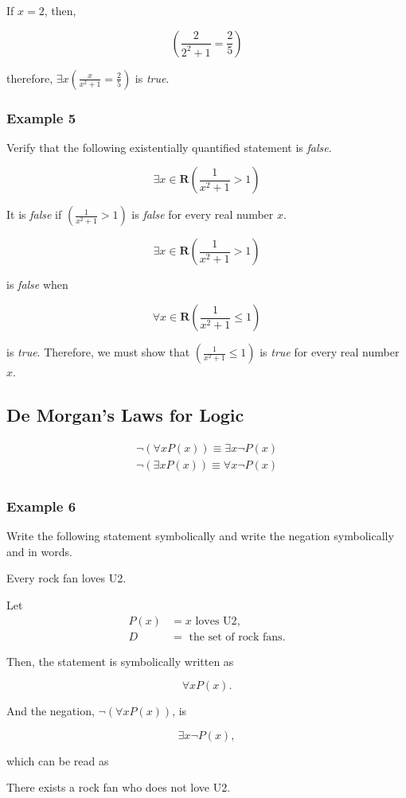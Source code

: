 If $x = 2$, then,

\[
    \left( \frac{2}{2^2 + 1} = \frac{2}{5} \right)
\]

therefore, $\exists x \left( \frac{x}{x^2 + 1} = \frac{2}{5} \right)$ is \textit{true}.

\subsubsection*{Example 5}

Verify that the following existentially quantified statement is \textit{false}.

\[
    \exists x \in \textbf{R} \left( \frac{1}{x^2 + 1} > 1 \right)
\]

It is \textit{false} if $\left( \frac{1}{x^2 + 1} > 1 \right)$ is \textit{false} for every real number $x$.

\[
    \exists x \in \textbf{R} \left( \frac{1}{x^2 + 1} > 1 \right)
\]

is \textit{false} when

\[
    \forall x \in \textbf{R} \left( \frac{1}{x^2 + 1} \leq 1 \right)
\]

is \textit{true}.  Therefore, we must show that $\left( \frac{1}{x^2 + 1} \leq 1 \right)$ is \textit{true} for every real number $x$.

\subsection*{De Morgan's Laws for Logic}

\begin{align*}
    \lnot(\forall x P(x)) \equiv \exists x \lnot P(x)\\
    \lnot(\exists x P(x)) \equiv \forall x \lnot P(x)\\
\end{align*}

\subsubsection{Example 6}

Write the following statement symbolically and write the negation symbolically and in words.
\begin{center}
    Every rock fan loves U2.
\end{center}

Let
\begin{align*}
    P(x) &= x \text{ loves U2},\\
    D &= \text{ the set of rock fans}.
\end{align*}

Then, the statement is symbolically written as 

\[
    \forall x P(x).
\]

And the negation, $\lnot (\forall x P(x))$, is

\[
    \exists x \lnot P(x),
\]

which can be read as

\begin{center}
    There exists a rock fan who does not love U2.
\end{center}

